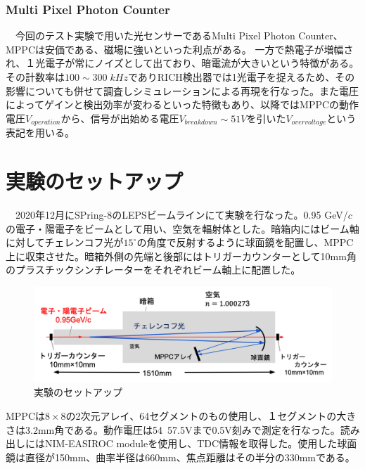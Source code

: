 \documentclass[uplatex, titlepage, dvipdfmx, 12pt, a4paper]{jsreport}
\begin{document}
\subsection{Multi Pixel Photon Counter}
　今回のテスト実験で用いた光センサーであるMulti Pixel Photon Counter、MPPCは安価である、磁場に強いといった利点がある。
一方で熱電子が増幅され、１光電子が常にノイズとして出ており、暗電流が大きいという特徴がある。
その計数率は$100\sim 300\; \si{kHz}$でありRICH検出器では1光電子を捉えるため、その影響についても併せて調査しシミュレーションによる再現を行なった。また電圧によってゲインと検出効率が変わるといった特徴もあり、以降ではMPPCの動作電圧$V_{operation}$から、信号が出始める電圧$V_{breakdown}\sim51V$を引いた$V_{over voltage}$という表記を用いる。
\chapter{実験のセットアップ}
 　2020年12月にSPring-8のLEPSビームラインにて実験を行なった。0.95 GeV/$c$の電子・陽電子をビームとして用い、空気を輻射体とした。暗箱内にはビーム軸に対してチェレンコフ光が$15^\circ$の角度で反射するように球面鏡を配置し、MPPC上に収束させた。暗箱外側の先端と後部にはトリガーカウンターとして10mm角のプラスチックシンチレーターをそれぞれビーム軸上に配置した。
 
 \begin{figure}[htbp]
  \begin{center} 
    \includegraphics[clip, scale=0.6]{image/setup.png}
    \caption{実験のセットアップ}
    \label{fig:setup} 
  \end{center}
\end{figure}
MPPCは$8\times8$の2次元アレイ、64セグメントのもの使用し、１セグメントの大きさは3.2mm角である。動作電圧は54~57.5Vまで0.5V刻みで測定を行なった。読み出しにはNIM-EASIROC moduleを使用し、TDC情報を取得した。使用した球面鏡は直径が150mm、曲率半径は660mm、焦点距離はその半分の330mmである。
\end{document}
